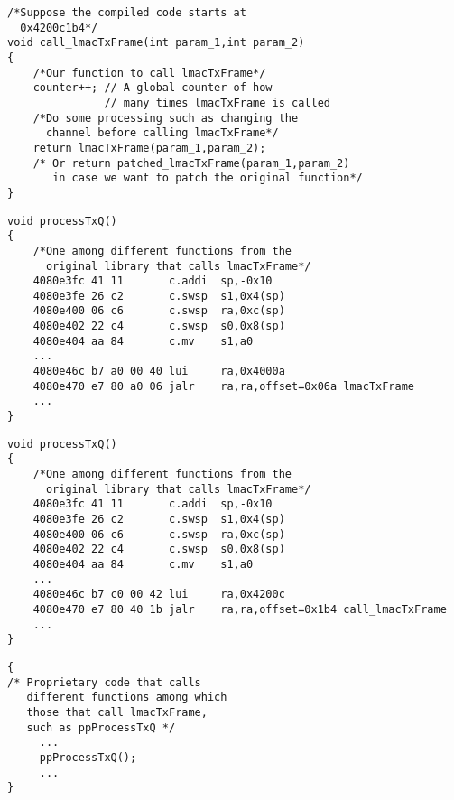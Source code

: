 \newsavebox\funcalllmactxframe
\begin{lrbox}{\funcalllmactxframe}
\begin{lstlisting}
/*Suppose the compiled code starts at 
  0x4200c1b4*/
void call_lmacTxFrame(int param_1,int param_2)
{
    /*Our function to call lmacTxFrame*/
    counter++; // A global counter of how 
               // many times lmacTxFrame is called
    /*Do some processing such as changing the
      channel before calling lmacTxFrame*/
    return lmacTxFrame(param_1,param_2);
    /* Or return patched_lmacTxFrame(param_1,param_2)
       in case we want to patch the original function*/
}
\end{lstlisting}
\end{lrbox}

\newsavebox\funprocesstxq
\begin{lrbox}{\funprocesstxq}
\begin{lstlisting}
void processTxQ()
{
    /*One among different functions from the 
      original library that calls lmacTxFrame*/
    4080e3fc 41 11       c.addi  sp,-0x10
    4080e3fe 26 c2       c.swsp  s1,0x4(sp)
    4080e400 06 c6       c.swsp  ra,0xc(sp)
    4080e402 22 c4       c.swsp  s0,0x8(sp)
    4080e404 aa 84       c.mv    s1,a0
    ... 
    4080e46c b7 a0 00 40 lui     ra,0x4000a
    4080e470 e7 80 a0 06 jalr    ra,ra,offset=0x06a lmacTxFrame 
    ...
}
\end{lstlisting}
\end{lrbox}


\newsavebox\funprocesstxqaft
\begin{lrbox}{\funprocesstxqaft}
\begin{lstlisting}
void processTxQ()
{
    /*One among different functions from the 
      original library that calls lmacTxFrame*/
    4080e3fc 41 11       c.addi  sp,-0x10
    4080e3fe 26 c2       c.swsp  s1,0x4(sp)
    4080e400 06 c6       c.swsp  ra,0xc(sp)
    4080e402 22 c4       c.swsp  s0,0x8(sp)
    4080e404 aa 84       c.mv    s1,a0
    ... 
    4080e46c b7 c0 00 42 lui     ra,0x4200c
    4080e470 e7 80 40 1b jalr    ra,ra,offset=0x1b4 call_lmacTxFrame 
    ...
}
\end{lstlisting}
\end{lrbox}

\newsavebox\funpropcode
\begin{lrbox}{\funpropcode}
\begin{lstlisting}
{
/* Proprietary code that calls 
   different functions among which
   those that call lmacTxFrame,
   such as ppProcessTxQ */
     ...
     ppProcessTxQ();
     ...
}
\end{lstlisting}
\end{lrbox}


